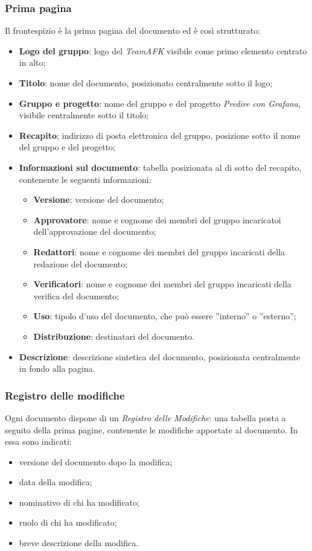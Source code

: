 \subsubsection{Prima pagina}
Il frontespizio è la prima pagina del documento ed è così strutturato:\begin{itemize}
\item \textbf{Logo del gruppo}: logo del \textit{TeamAFK} visibile come primo elemento centrato in alto;
\item \textbf{Titolo}: nome del documento, posizionato centralmente sotto il logo;
\item \textbf{Gruppo e progetto}: nome del gruppo e del progetto \textit{Predire con Grafana}, visibile centralmente sotto il titolo;
\item \textbf{Recapito}; indirizzo di posta elettronica del gruppo, posizione sotto il nome del gruppo e del progetto;
\item \textbf{Informazioni sul documento}: tabella posizionata al di sotto del recapito, contenente le seguenti informazioni: \begin{itemize}
\item \textbf{Versione}: versione del documento;
\item \textbf{Approvatore}: nome e cognome dei membri del gruppo incaricatoi dell'approvazione del documento;
\item \textbf{Redattori}: nome e cognome dei membri del gruppo incaricati della redazione del documento;
\item \textbf{Verificatori}: nome e cognome dei membri del gruppo incaricati della verifica del documento;
\item \textbf{Uso}: tipolo d'uso del documento, che può essere ''interno'' o ''esterno'';
\item \textbf{Distribuzione}: destinatari del documento.
\end{itemize}
\item \textbf{Descrizione}: descrizione sintetica del documento, posizionata centralmente in fondo alla pagina.
\end{itemize}

\subsubsection{Registro delle modifiche}
Ogni documento dispone di un \textit{Registro delle Modifiche}: una tabella posta a seguito della prima pagine, contenente le modifiche apportate al documento. In essa sono indicati: \begin{itemize}
\item versione del documento dopo la modifica;
\item data della modifica;
\item nominativo di chi ha modificato;
\item ruolo di chi ha modificato;
\item breve descrizione della modifica.
\end{itemize}

